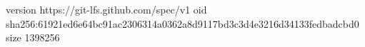 version https://git-lfs.github.com/spec/v1
oid sha256:61921ed6e64bc91ac2306314a0362a8d9117bd3c3d4e3216d34133fedbadcbd0
size 1398256
